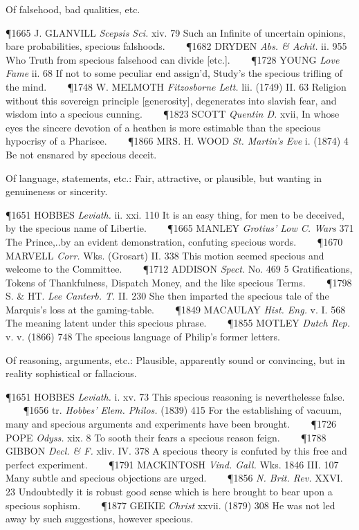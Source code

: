 \begin{description}[wide, labelwidth=!, labelindent=0pt]
\begin{myenumerate}
 Of falsehood, bad qualities, etc.

\P 1665 J. GLANVILL  \textit{Scepsis Sci.} xiv. 79 Such an Infinite of uncertain opinions, bare probabilities, specious falshoods.    
\P 1682 DRYDEN  \textit{Abs. \& Achit.} ii. 955 Who Truth from specious falsehood can divide [etc.].    
\P 1728 YOUNG  \textit{Love Fame} ii. 68 If not to some peculiar end assign'd, Study's the specious trifling of the mind.    
\P 1748 W. MELMOTH  \textit{Fitzosborne Lett.} lii. (1749) II. 63 Religion without this sovereign principle [generosity], degenerates into slavish fear, and wisdom into a specious cunning.    
\P 1823 SCOTT  \textit{Quentin D.} xvii, In whose eyes the sincere devotion of a heathen is more estimable than the specious hypocrisy of a Pharisee.    
\P 1866 MRS. H. WOOD  \textit{St. Martin's Eve} i. (1874) 4 Be not ensnared by specious deceit.

 Of language, statements, etc.: Fair, attractive, or plausible, but wanting in genuineness or sincerity.

\P 1651 HOBBES  \textit{Leviath.} ii. xxi. 110 It is an easy thing, for men to be deceived, by the specious name of Libertie.    
\P 1665 MANLEY  \textit{Grotius' Low C. Wars} 371 The Prince,..by an evident demonstration, confuting specious words.    
\P 1670 MARVELL  \textit{Corr.} Wks. (Grosart) II. 338 This motion seemed specious and welcome to the Committee.    
\P 1712 ADDISON  \textit{Spect.} No. 469 5 Gratifications, Tokens of Thankfulness, Dispatch Money, and the like specious Terms.    
\P 1798 S. \& HT.  \textit{Lee Canterb. T.} II. 230 She then imparted the specious tale of the Marquis's loss at the gaming-table.    
\P 1849 MACAULAY  \textit{Hist. Eng.} v. I. 568 The meaning latent under this specious phrase.    
\P 1855 MOTLEY  \textit{Dutch Rep.} v. v. (1866) 748 The specious language of Philip's former letters.

 Of reasoning, arguments, etc.: Plausible, apparently sound or convincing, but in reality sophistical or fallacious.

\P 1651 HOBBES  \textit{Leviath.} i. xv. 73 This specious reasoning is neverthelesse false.    
\P 1656 tr.  \textit{Hobbes' Elem. Philos.} (1839) 415 For the establishing of vacuum, many and specious arguments and experiments have been brought.    
\P 1726 POPE  \textit{Odyss.} xix. 8 To sooth their fears a specious reason feign.    
\P 1788 GIBBON  \textit{Decl. \& F.} xliv. IV. 378 A specious theory is confuted by this free and perfect experiment.    
\P 1791 MACKINTOSH  \textit{Vind. Gall.} Wks. 1846 III.  107 Many subtle and specious objections are urged.    
\P 1856 \textit{N. Brit.  Rev.} XXVI. 23 Undoubtedly it is robust good sense which is here brought to bear upon a specious sophism.    
\P 1877 GEIKIE  \textit{Christ} xxvii. (1879) 308 He was not led away by such suggestions, however specious.


\end{myenumerate}
\end{description}
